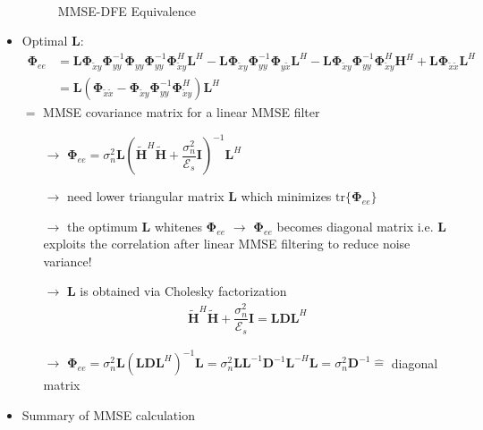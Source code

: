 \documentclass[a4paper, 10pt]{article}
\begin{document}
\begin{itemize}
\begin{align*}
	\end{align*}
	\begin{figure}[h]
		\centering
		\resizebox{\textwidth}{!}{}
		\caption{MMSE-DFE Equivalence}
		\label{fig:MMSE_DFE_Equiv.pstex_t}
	\end{figure}
	\item Optimal $\mathbf{L}$:
	\begin{align*}
		\boldsymbol{\Phi}_{ee}&=\mathbf{L}\boldsymbol{\Phi}_{\tilde{x}y}\boldsymbol{\Phi}_{yy}^{-1}\boldsymbol{\Phi}_{yy}\boldsymbol{\Phi}_{yy}^{-1}\boldsymbol{\Phi}_{\tilde{x}y}^H\mathbf{L}^H
		-\mathbf{L}\boldsymbol{\Phi}_{\tilde{x}y}\boldsymbol{\Phi}_{yy}^{-1}\boldsymbol{\Phi}_{y\tilde{x}}\mathbf{L}^H
		-\mathbf{L}\boldsymbol{\Phi}_{\tilde{x}y}\boldsymbol{\Phi}_{yy}^{-1}\boldsymbol{\Phi}_{\tilde{x}y}^H\mathbf{H}^H+\mathbf{L}\boldsymbol{\Phi}_{\tilde{x}\tilde{x}}\mathbf{L}^H\\ 
		&=\mathbf{L}(\boldsymbol{\Phi}_{\tilde{x}\tilde{x}}-\boldsymbol{\Phi}_{\tilde{x}y}\boldsymbol{\Phi}_{yy}^{-1}\boldsymbol{\Phi}_{\tilde{x}y}^H)\mathbf{L}^H
	\end{align*}
	$=$ MMSE covariance matrix for a linear MMSE filter
	\begin{itemize}
		\item[$\rightarrow$]$\boldsymbol{\Phi}_{ee}=\sigma_n^2\mathbf{L}(\tilde{\mathbf{H}}^H\tilde{\mathbf{H}}+\dfrac{\sigma_n^2}{\mathcal{E}_s}\mathbf{I})^{-1}\mathbf{L}^H$
		\item[$\rightarrow$] need lower triangular matrix $\mathbf{L}$ which minimizes $\mathrm{tr}\{\boldsymbol{\Phi}_{ee}\}$
		\item[$\rightarrow$] the optimum $\mathbf{L}$ whitenes $\boldsymbol{\Phi}_{ee}$ $\rightarrow$  $\boldsymbol{\Phi}_{ee}$ becomes diagonal matrix i.e. $\mathbf{L}$ exploits the correlation after linear MMSE filtering
		to reduce noise variance!
		\item[$\rightarrow$] $\mathbf{L}$ is obtained via Cholesky factorization
		\begin{align*}
			\tilde{\mathbf{H}}^H\tilde{\mathbf{H}}+\dfrac{\sigma_n^2}{\mathcal{E}_s}\mathbf{I}=\mathbf{LDL}^H
		\end{align*}
		\item[$\rightarrow$] $\boldsymbol{\Phi}_{ee}=\sigma_n^2 \mathbf{L}(\mathbf{LDL}^H)^{-1}\mathbf{L}=\sigma_n^2\mathbf{LL}^{-1}\mathbf{D}^{-1}\mathbf{L}^{-H}\mathbf{L}=\sigma_n^2\mathbf{D}^{-1}\widehat{=}$ diagonal matrix
	\end{itemize}
	\item Summary of MMSE calculation

\end{itemize}
\end{document}
